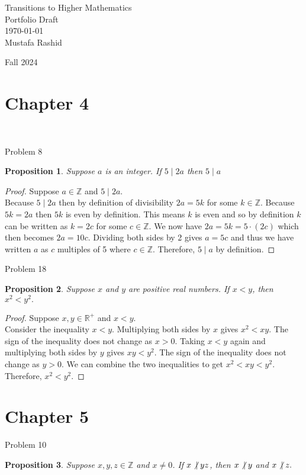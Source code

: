 \documentclass[12pt,letterpaper, onecolumn]{exam}
\newtheorem*{prop}{Proposition}
\newcommand{\doesnotdivide}{\not\hspace{2.5pt}\mid}
\begin{document}
	\begingroup  
	\centering
	\LARGE Transitions to Higher Mathematics\\
	\LARGE Portfolio Draft\\[0.5em]
	\large \today\\[0.5em]
	\large Mustafa Rashid\par
	\large Fall 2024\par
	\endgroup

	\section{Chapter 4}\\
	\centerline {Problem 8}
	\begin{prop}
	Suppose $a$ is an integer. If $5\mid 2a$ then $5\mid a$
	\end{prop}
	
	\begin{proof}
	Suppose $a\in\mathbb{Z}$ and $5\mid 2a$.\\
	Because $5\mid 2a$ then by definition of divisibility $2a=5k$ for some $k\in\mathbb{Z}$. Because $5k=2a$ then $5k$ is even by definition.  This means $k$ is even  and so by definition $k$ can be written as $k=2c$ for some $c\in\mathbb{Z}$. We now have $2a=5k=5\cdot(2c)$ which then becomes $2a=10c$. Dividing both sides by 2 gives $a=5c$ and thus we have written $a$ as $c$ multiples of 5 where $c\in\mathbb{Z}$. Therefore, $5\mid a$ by definition.
	
	\end{proof}
	\centerline{Problem 18}
	\begin{prop}
		Suppose $x$ and $y$ are positive real numbers. If $x<y$, then $x^2<y^2.$
	\end{prop}
	
	\begin{proof}
		Suppose $x,y \in \mathbb{R^{+}}$ and $x<y$.\\
		Consider the inequality $x<y$. Multiplying both sides by $x$ gives $x^2<xy$. The sign of the inequality does not change as $x>0$. Taking $x<y$ again and multiplying both sides by $y$ gives $xy<y^2$. The sign of the inequality does not change as $y>0$. We can combine the two inequalities to get $x^2<xy<y^2$. Therefore, $x^2<y^2$.
	\end{proof}
		\section{Chapter 5}
	\centerline{Problem 10 }
	\begin{prop}
	Suppose $x,y,z\in \mathbb{Z}$ and $x\neq0$. If $x\doesnotdivide yz$, then $x\doesnotdivide y$ and $x\doesnotdivide z.$
	\end{prop}
\end{document}
